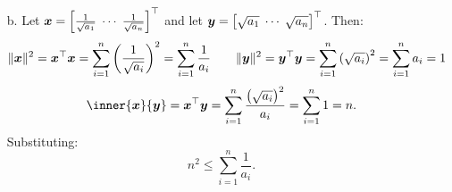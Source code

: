 \documentclass[11pt]{article}
\begin{document}
\begin{enumerate}
\begin{enumerate}
                    \pagebreak

              \item[b.] Let $\boldsymbol{x} = \left [ \frac{1}{\sqrt{a_1}} \; \cdots \; \frac{1}{\sqrt{a_n}} \right ]^\top$ and let
                    $\boldsymbol{y} = \left [ \sqrt{a_1} \; \cdots \; \sqrt{a_n} \right ]^\top$. Then:
                    \[
                        \lVert\boldsymbol{x}\rVert^2
                        = \boldsymbol{x}^\top \boldsymbol{x}
                        = \sum_{i=1}^n \left ( \frac{1}{\sqrt{a_i}} \right )^2
                        = \sum_{i=1}^n \frac{1}{a_i}
                        \qquad
                        \lVert\boldsymbol{y}\rVert^2
                        = \boldsymbol{y}^\top \boldsymbol{y}
                        = \sum_{i=1}^n \left ( \sqrt{a_i} \right )^2
                        = \sum_{i=1}^n a_i = 1
                    \]
                    \[
                        \inner{\x}{\y}
                        = \x^\top \y
                        = \sum_{i=1}^n \frac{\left ( \sqrt{a_i} \right )^2}{a_i} = \sum_{i=1}^n 1 = n.
                    \]
                    Substituting:
                    \[
                        n^2
                        \leq \sum_{i=1}^n \frac{1}{a_i}.
                    \]
          \end{enumerate}


\end{enumerate}
\end{document}
